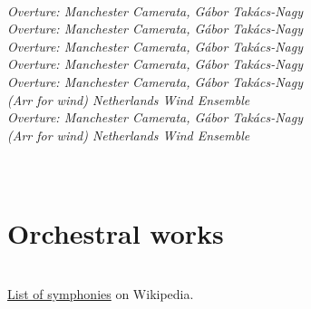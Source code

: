  \\

  \textit{Overture: Manchester Camerata, Gábor Takács-Nagy}\marginnote{} \\
  \textit{Overture: Manchester Camerata, Gábor Takács-Nagy}\marginnote{} \\
  \textit{Overture: Manchester Camerata, Gábor Takács-Nagy}\marginnote{} \\
  \textit{Overture: Manchester Camerata, Gábor Takács-Nagy}\marginnote{} \\
  \textit{Overture: Manchester Camerata, Gábor Takács-Nagy}\marginnote{} \\
 \textit{(Arr for wind) Netherlands Wind Ensemble}\marginnote{} \\
  \textit{Overture: Manchester Camerata, Gábor Takács-Nagy}\marginnote{} \\
 \textit{(Arr for wind) Netherlands Wind Ensemble}\marginnote{} \\ 

\bigskip
{} \\

\bigskip
{} \\


\section{Orchestral works} %
\label{sec:orchestral_works}

 \\
\href{https://en.wikipedia.org/wiki/List_of_symphonies_by_Wolfgang_Amadeus_Mozart}{List of symphonies} on Wikipedia.

